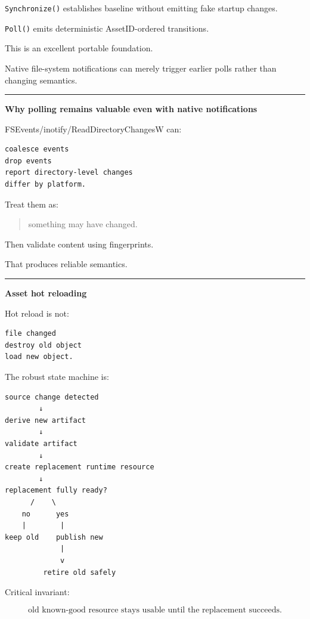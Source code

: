 \texttt{Synchronize()} establishes baseline without emitting fake startup changes.

\texttt{Poll()} emits deterministic AssetID-ordered transitions.

This is an excellent portable foundation.

Native file-system notifications can merely trigger earlier polls rather than changing semantics.

\begin{center}\rule{0.5\linewidth}{0.5pt}\end{center}

\textbf{Why polling remains valuable even with native notifications}

FSEvents/inotify/ReadDirectoryChangesW can:

\begin{verbatim}
coalesce events
drop events
report directory-level changes
differ by platform.
\end{verbatim}

Treat them as:

\begin{quote}
something may have changed.
\end{quote}

Then validate content using fingerprints.

That produces reliable semantics.

\begin{center}\rule{0.5\linewidth}{0.5pt}\end{center}

\textbf{Asset hot reloading}

Hot reload is not:

\begin{verbatim}
file changed
destroy old object
load new object.
\end{verbatim}

The robust state machine is:

\begin{verbatim}
source change detected
        ↓
derive new artifact
        ↓
validate artifact
        ↓
create replacement runtime resource
        ↓
replacement fully ready?
      /    \
    no      yes
    |        |
keep old    publish new
             |
             v
         retire old safely
\end{verbatim}

Critical invariant:

\[
\boxed{
\text{old known-good resource stays usable until the replacement succeeds.}
}
\]

